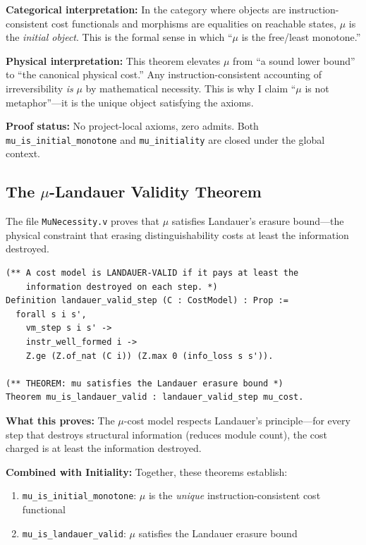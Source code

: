 \textbf{Categorical interpretation:} In the category where objects are instruction-consistent cost functionals and morphisms are equalities on reachable states, $\mu$ is the \textit{initial object}. This is the formal sense in which ``$\mu$ is the free/least monotone.''

\textbf{Physical interpretation:} This theorem elevates $\mu$ from ``a sound lower bound'' to ``the canonical physical cost.'' Any instruction-consistent accounting of irreversibility \textit{is} $\mu$ by mathematical necessity. This is why I claim ``$\mu$ is not metaphor''—it is the unique object satisfying the axioms.

\textbf{Proof status:} No project-local axioms, zero admits. Both \texttt{mu\_is\_initial\_monotone} and \texttt{mu\_initiality} are closed under the global context.

\subsection{The $\mu$-Landauer Validity Theorem}

The file \texttt{MuNecessity.v} proves that $\mu$ satisfies Landauer's erasure bound---the physical constraint that erasing distinguishability costs at least the information destroyed.

\begin{lstlisting}
(** A cost model is LANDAUER-VALID if it pays at least the 
    information destroyed on each step. *)
Definition landauer_valid_step (C : CostModel) : Prop :=
  forall s i s',
    vm_step s i s' ->
    instr_well_formed i ->
    Z.ge (Z.of_nat (C i)) (Z.max 0 (info_loss s s')).

(** THEOREM: mu satisfies the Landauer erasure bound *)
Theorem mu_is_landauer_valid : landauer_valid_step mu_cost.
\end{lstlisting}

\textbf{What this proves:} The $\mu$-cost model respects Landauer's principle—for every step that destroys structural information (reduces module count), the cost charged is at least the information destroyed.

\textbf{Combined with Initiality:} Together, these theorems establish:
\begin{enumerate}
    \item \texttt{mu\_is\_initial\_monotone}: $\mu$ is the \textit{unique} instruction-consistent cost functional
    \item \texttt{mu\_is\_landauer\_valid}: $\mu$ satisfies the Landauer erasure bound
\end{enumerate}

